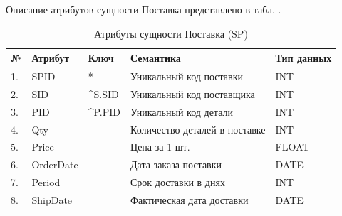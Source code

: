Описание атрибутов сущности  Поставка представлено в табл. .
\begin{table}[h]
	\caption{\space Атрибуты сущности Поставка (SP)}
	\label{relation}
	\begin{tabular}{|p{0.4cm}|p{2.5cm}|p{1.5cm}|p{6.3cm}|p{3.2cm}|}
		\hline
		\textbf{№} & \textbf{Атрибут} & \textbf{Ключ} & \textbf{Семантика} & \textbf{Тип данных} \\
		\hline
		1. & SPID & * & Уникальный код поставки & INT \\
		\hline
		2. & SID & \textasciicircum S.SID & Уникальный код поставщика & INT \\
		\hline
		3. & PID & \textasciicircum P.PID & Уникальный код детали & INT \\
		\hline
		4. & Qty & & Количество деталей в поставке & INT \\
		\hline
		5. & Price & & Цена за 1 шт. & FLOAT \\
		\hline
		6. & OrderDate & & Дата заказа поставки & DATE \\
		\hline
		7. & Period & & Срок доставки в днях & INT \\
		\hline
		8. & ShipDate & & Фактическая дата доставки & DATE \\
		\hline
	\end{tabular}
\end{table}

